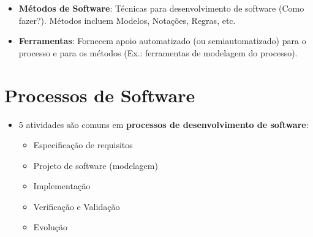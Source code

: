 \documentclass[a4paper, 11pt]{article}
\begin{document}
\begin{itemize}
\begin{itemize}
		\item \textbf{Métodos de Software}: Técnicas para desenvolvimento de software (Como fazer?). Métodos incluem Modelos, Notações, Regras, etc.
		
		\item \textbf{Ferramentas}: Fornecem apoio automatizado (ou semiautomatizado) para o processo e para os métodos (Ex.: ferramentas de modelagem do processo).
	\end{itemize}
\end{itemize}


\section{Processos de Software}
\begin{itemize}
	\item 5 atividades são comuns em \textbf{processos de desenvolvimento de software}:
	\begin{itemize}
		\item Especificação de requisitos
		\item Projeto de software (modelagem)
		\item Implementação
		\item Verificação e Validação
		\item Evolução
	\end{itemize}
\end{itemize}
\end{document}
